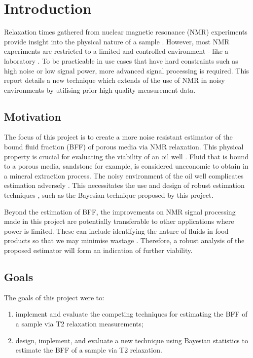 \chapter{Introduction}\label{C:intro}
Relaxation times gathered from nuclear magnetic resonance (NMR) experiments provide insight into the physical nature of a sample \cite{GruberLinearFunctionals2013}. However, most NMR experiments are restricted to a limited and controlled environment - like a laboratory \cite{IntrinsicSNREdelstein1986}. To be practicable in use cases that have hard constraints such as high noise or low signal power, more advanced signal processing is required. This report details a new technique which extends of the use of NMR in noisy environments by utilising prior high quality measurement data.

\section{Motivation}
The focus of this project is to create a more noise resistant estimator of the bound fluid fraction (BFF) of porous media via NMR relaxation. This physical property is crucial for evaluating the viability of an oil well \cite{wellLoggingBook}.  Fluid that is bound to a porous media, sandstone for example, is considered uneconomic to obtain in a mineral extraction process. The noisy environment of the oil well complicates estimation adversely \cite{wellLoggingBook}. This necessitates the use and design of robust estimation techniques \cite{BadTruthLaplaceEpstein2008}\cite{NumericalInversionLaplaceTransform1978}, such as the Bayesian technique proposed by this project. 

Beyond the estimation of BFF, the improvements on NMR signal processing made in this project are potentially transferable to other applications where power is limited. These can include identifying the nature of fluids in food products so that we may minimise wastage \cite{NMRFOODCapitani2017}. Therefore, a robust analysis of the proposed estimator will form an indication of further viability.



\section{Goals}
The goals of this project were to:
\begin{enumerate}
    \item implement and evaluate the competing techniques for estimating the BFF of a sample via T2 relaxation measurements;
    \item design, implement, and evaluate a new technique using Bayesian statistics to estimate the BFF of a sample via T2 relaxation.

\end{enumerate}


